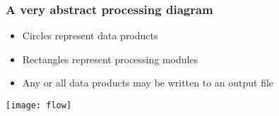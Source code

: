 \documentclass{beamer}
\begin{document}
\begin{frame}
  \frametitle{A very abstract processing diagram}
  \begin{itemize}
    \item Circles represent data products
    \item Rectangles represent processing modules
    \item Any or all data products may be written to an output file
  \end{itemize}
  \texttt{[image: flow]}
\end{frame}
\end{document}
